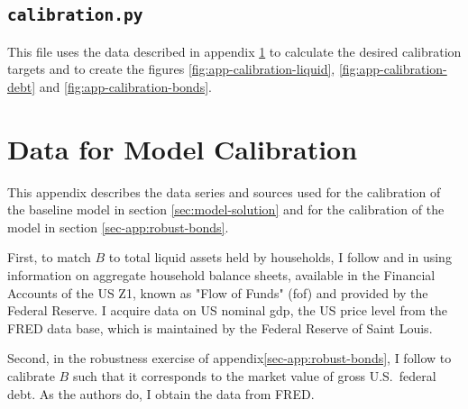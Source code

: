 \documentclass[a4paper,12pt]{article} %
\numberwithin{equation}{section} %
\numberwithin{figure}{section}
\numberwithin{table}{section}
\begin{document}
\begin{refsection}
\begin{appendices}
\subsection*{\texttt{calibration.py}}

This file uses the data described in appendix \ref{sec-app:data} to calculate the desired calibration targets and to create the figures \ref{fig:app-calibration-liquid}, \ref{fig:app-calibration-debt} and \ref{fig:app-calibration-bonds}.

\section{Data for Model Calibration}
\label{sec-app:data}

This appendix describes the data series and sources used for the calibration of the baseline model in section \ref{sec:model-solution} and for the calibration of the model in section \ref{sec-app:robust-bonds}.

First, to match $B$ to total liquid assets held by households, I follow \textcite{mckay2016} and \textcite{gl2017} in using information on aggregate household balance sheets, available in the Financial Accounts of the US Z1, known as "Flow of Funds" (\Gls{fof}) and provided by the Federal Reserve. I acquire data on US nominal \Gls{gdp}, the US price level from the FRED data base, which is maintained by the Federal Reserve of Saint Louis. 

Second, in the robustness exercise of appendix\ref{sec-app:robust-bonds}, I follow \textcite{bayer2023} to calibrate $B$ such that it corresponds to the market value of gross U.S.~federal debt. As the authors do, I obtain the data from FRED.


\end{appendices}
\end{refsection}
\end{document}

